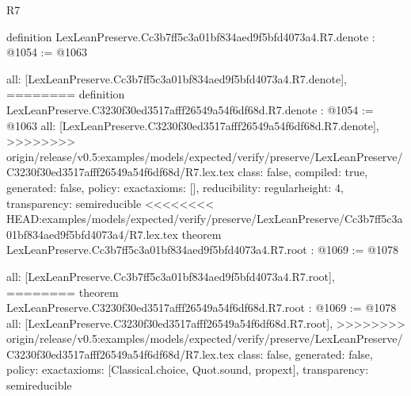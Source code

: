 \begin{lexlean}{R7}
\begin{coremodule}
{{{{{{{{{{{definition LexLeanPreserve.Cc3b7ff5c3a01bf834aed9f5bfd4073a4.R7.denote : @1054 := @1063 {
  all: [LexLeanPreserve.Cc3b7ff5c3a01bf834aed9f5bfd4073a4.R7.denote],
========
definition LexLeanPreserve.C3230f30ed3517afff26549a54f6df68d.R7.denote : @1054 := @1063 {
  all: [LexLeanPreserve.C3230f30ed3517afff26549a54f6df68d.R7.denote],
>>>>>>>> origin/release/v0.5:examples/models/expected/verify/preserve/LexLeanPreserve/C3230f30ed3517afff26549a54f6df68d/R7.lex.tex
  class: false,
  compiled: true,
  generated: false,
  policy: exact{axioms: []},
  reducibility: regular{height: 4},
  transparency: semireducible
}
<<<<<<<< HEAD:examples/models/expected/verify/preserve/LexLeanPreserve/Cc3b7ff5c3a01bf834aed9f5bfd4073a4/R7.lex.tex
theorem LexLeanPreserve.Cc3b7ff5c3a01bf834aed9f5bfd4073a4.R7.root : @1069 := @1078 {
  all: [LexLeanPreserve.Cc3b7ff5c3a01bf834aed9f5bfd4073a4.R7.root],
========
theorem LexLeanPreserve.C3230f30ed3517afff26549a54f6df68d.R7.root : @1069 := @1078 {
  all: [LexLeanPreserve.C3230f30ed3517afff26549a54f6df68d.R7.root],
>>>>>>>> origin/release/v0.5:examples/models/expected/verify/preserve/LexLeanPreserve/C3230f30ed3517afff26549a54f6df68d/R7.lex.tex
  class: false,
  generated: false,
  policy: exact{axioms: [Classical.choice, Quot.sound, propext]},
  transparency: semireducible
}

}}}}}}}}}}}}}
\end{coremodule}
\end{lexlean}
